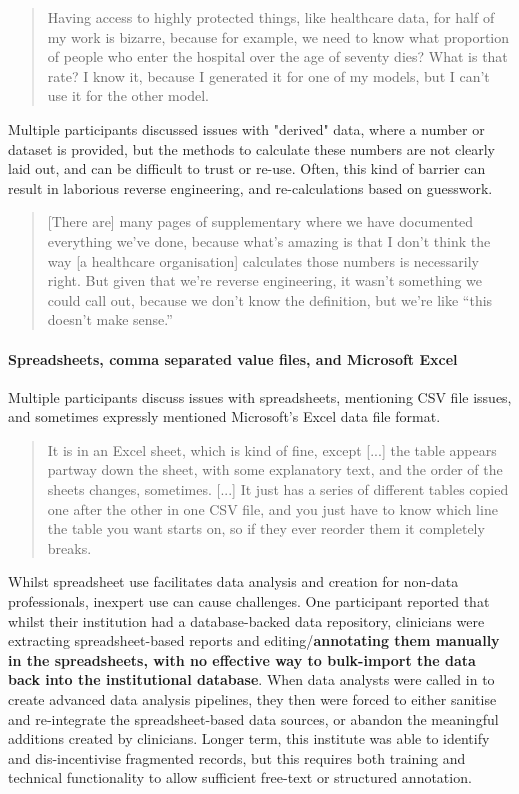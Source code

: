 \documentclass{CUP-JNL-DAP}%
\begin{document}
\blockquote{Having access to highly protected things, like healthcare data, for half of my work is bizarre, because for example, we need to know what proportion of people who enter the hospital over the age of seventy dies? What is that rate? I know it, because I generated it for one of my models, but I can't use it for the other model.}

Multiple participants discussed issues with "derived" data, where a number or dataset is provided, but the methods to calculate these numbers are not clearly laid out, and can be difficult to trust or re-use. Often, this kind of barrier can result in laborious reverse engineering, and re-calculations based on guesswork. 

\blockquote{[There are] many pages of supplementary where we have documented everything we've done, because what's amazing is that I don't think the way [a healthcare organisation] calculates those numbers is necessarily right. But given that we're reverse engineering, it wasn't something we could call out, because we don't know the definition, but we're like \enquote{this doesn't make sense.}}

\paragraph{Spreadsheets, comma separated value files, and Microsoft Excel}
Multiple participants discuss issues with spreadsheets, mentioning CSV file issues, and sometimes expressly mentioned Microsoft's Excel data file format.

\blockquote{It is in an Excel sheet, which is kind of fine, except [...] the table appears partway down the sheet, with some explanatory text, and the order of the sheets changes, sometimes. [...] It just has a series of different tables copied one after the other in one CSV file, and you just have to know which line the table you want starts on, so if they ever reorder them it completely breaks.}

Whilst spreadsheet use facilitates data analysis and creation for non-data professionals, inexpert use can cause challenges. One participant reported that whilst their institution had a database-backed data repository, clinicians were extracting spreadsheet-based reports and editing/\textbf{annotating them manually in the spreadsheets, with no effective way to bulk-import the data back into the institutional database}. When data analysts were called in to create advanced data analysis pipelines, they then were forced to either sanitise and re-integrate the spreadsheet-based data sources, or abandon the meaningful additions created by clinicians. Longer term, this institute was able to identify and dis-incentivise fragmented records, but this requires both training and technical functionality to allow sufficient free-text or structured annotation. 
\end{document}
